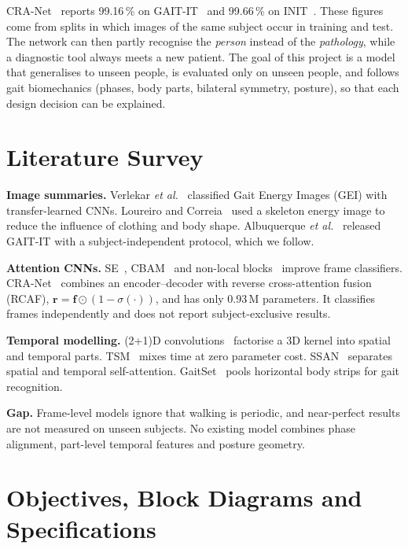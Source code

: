 \documentclass[conference]{IEEEtran}
\begin{document}
CRA-Net~\cite{bodepu_cranet} reports 99.16\,\% on GAIT-IT~\cite{albuquerque2021}
and 99.66\,\% on INIT~\cite{ortells2018}. These figures come from splits in which
images of the same subject occur in training and test. The network can then
partly recognise the \emph{person} instead of the \emph{pathology}, while a
diagnostic tool always meets a new patient. The goal of this project is a model
that generalises to unseen people, is evaluated only on unseen people, and
follows gait biomechanics (phases, body parts, bilateral symmetry, posture), so
that each design decision can be explained.

\section{Literature Survey}
\textbf{Image summaries.} Verlekar \textit{et al.}~\cite{verlekar2018}
classified Gait Energy Images (GEI) with transfer-learned CNNs. Loureiro and
Correia~\cite{loureiro2020} used a skeleton energy image to reduce the influence
of clothing and body shape. Albuquerque \textit{et al.}~\cite{albuquerque2021}
released GAIT-IT with a subject-independent protocol, which we follow.

\textbf{Attention CNNs.} SE~\cite{hu2018se}, CBAM~\cite{woo2018cbam} and
non-local blocks~\cite{wang2018nonlocal} improve frame classifiers.
CRA-Net~\cite{bodepu_cranet} combines an encoder--decoder with reverse
cross-attention fusion (RCAF), $\mathbf{r}=\mathbf{f}\odot(1-\sigma(\cdot))$,
and has only 0.93\,M parameters. It classifies frames independently and does not
report subject-exclusive results.

\textbf{Temporal modelling.} (2+1)D convolutions~\cite{tran2018r21d} factorise a
3D kernel into spatial and temporal parts. TSM~\cite{lin2019tsm} mixes time at
zero parameter cost. SSAN~\cite{guo2021ssan} separates spatial and temporal
self-attention. GaitSet~\cite{chao2019gaitset} pools horizontal body strips for
gait recognition.

\textbf{Gap.} Frame-level models ignore that walking is periodic, and
near-perfect results are not measured on unseen subjects. No existing model
combines phase alignment, part-level temporal features and posture geometry.

\section{Objectives, Block Diagrams and Specifications}
\end{document}
